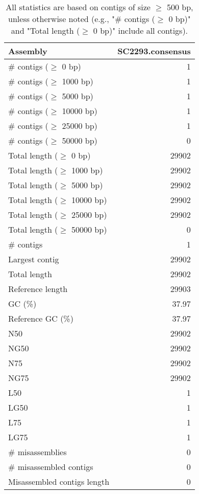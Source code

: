 \documentclass[12pt,a4paper]{article}
\begin{document}
\begin{table}[ht]
\begin{center}
\caption{All statistics are based on contigs of size $\geq$ 500 bp, unless otherwise noted (e.g., "\# contigs ($\geq$ 0 bp)" and "Total length ($\geq$ 0 bp)" include all contigs).}
\begin{tabular}{|l*{1}{|r}|}
\hline
Assembly & SC2293.consensus \\ \hline
\# contigs ($\geq$ 0 bp) & 1 \\ \hline
\# contigs ($\geq$ 1000 bp) & 1 \\ \hline
\# contigs ($\geq$ 5000 bp) & 1 \\ \hline
\# contigs ($\geq$ 10000 bp) & 1 \\ \hline
\# contigs ($\geq$ 25000 bp) & 1 \\ \hline
\# contigs ($\geq$ 50000 bp) & 0 \\ \hline
Total length ($\geq$ 0 bp) & 29902 \\ \hline
Total length ($\geq$ 1000 bp) & 29902 \\ \hline
Total length ($\geq$ 5000 bp) & 29902 \\ \hline
Total length ($\geq$ 10000 bp) & 29902 \\ \hline
Total length ($\geq$ 25000 bp) & 29902 \\ \hline
Total length ($\geq$ 50000 bp) & 0 \\ \hline
\# contigs & 1 \\ \hline
Largest contig & 29902 \\ \hline
Total length & 29902 \\ \hline
Reference length & 29903 \\ \hline
GC (\%) & 37.97 \\ \hline
Reference GC (\%) & 37.97 \\ \hline
N50 & 29902 \\ \hline
NG50 & 29902 \\ \hline
N75 & 29902 \\ \hline
NG75 & 29902 \\ \hline
L50 & 1 \\ \hline
LG50 & 1 \\ \hline
L75 & 1 \\ \hline
LG75 & 1 \\ \hline
\# misassemblies & 0 \\ \hline
\# misassembled contigs & 0 \\ \hline
Misassembled contigs length & 0 \\ \hline

\end{tabular}
\end{center}
\end{table}
\end{document}
